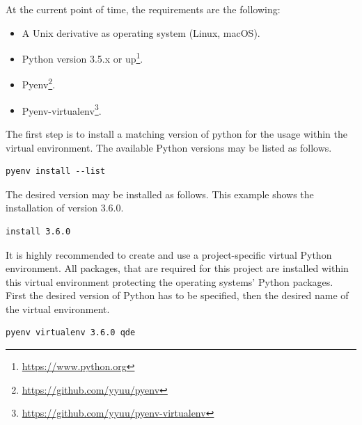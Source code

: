 \documentclass[10pt, openright, notitlepage]{scrreprt}
\begin{document}
At the current point of time, the requirements are the following:

\begin{itemize}
\item A Unix derivative as operating system (Linux, macOS).
\item Python version 3.5.x or up\footnote{\url{https://www.python.org}}.
\item Pyenv\footnote{\url{https://github.com/yyuu/pyenv}}.
\item Pyenv-virtualenv\footnote{\url{https://github.com/yyuu/pyenv-virtualenv}}.
\end{itemize}

The first step is to install a matching version of python for the usage within
the virtual environment. The available Python versions may be listed as follows.

\begin{listing}[H]
\begin{verbatim}
pyenv install --list
\end{verbatim}
\caption{\label{fig:impl-pyenv-list}
Listing all available versions of Python for use in Pyenv.}
\end{listing}

The desired version may be installed as follows. This example shows the
installation of version 3.6.0.

\begin{listing}[H]
\begin{verbatim}
install 3.6.0
\end{verbatim}
\caption{\label{fig:impl-pyenv-install}
Installation of Python version 3.6.0 for the usage with Pyenv.}
\end{listing}

It is highly recommended to create and use a project-specific virtual Python
environment. All packages, that are required for this project are installed
within this virtual environment protecting the operating systems' Python
packages.
First the desired version of Python has to be specified, then the desired name
of the virtual environment.

\begin{listing}[H]
\begin{verbatim}
pyenv virtualenv 3.6.0 qde
\end{verbatim}
\caption{\label{fig:impl-pyenv-venv}
Creation of the virtual environment \texttt{qde} for Python using version 3.6.0 of Python.}
\end{listing}
\end{document}
